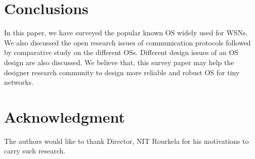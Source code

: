 \documentclass[12pt,journal,communications surveys and tutorials]{IEEEtran}
\begin{document}
 \section{Conclusions}
 In this paper, we have surveyed the popular known OS widely used for WSNs. We also discussed the open research issues of communication protocols followed by comparative study on the different OSs. Different design issues of an OS design  are also discussed. We believe  that, this survey paper may help the designer research community to design more reliable and robust OS for tiny networks.






































  \section*{Acknowledgment}


The authors would like to thank Director, NIT Rourkela for his motivations to carry such research.


\ifCLASSOPTIONcaptionsoff
  \newpage
\fi







\end{document}
